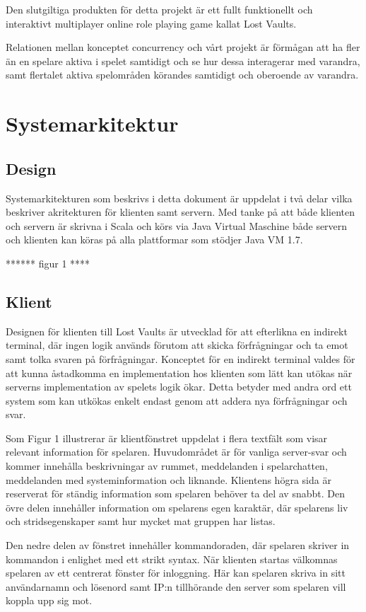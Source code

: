 \documentclass[a4paper]{article}
\begin{document}
Den slutgiltiga produkten för detta projekt är ett fullt funktionellt och interaktivt multiplayer online role playing game kallat Lost Vaults.

Relationen mellan konceptet concurrency och vårt projekt är förmågan att ha fler än en spelare aktiva i spelet samtidigt och se hur dessa interagerar med varandra, samt flertalet 
aktiva spelområden körandes samtidigt och oberoende av varandra.

\section{Systemarkitektur}
\subsection{Design}
Systemarkitekturen som beskrivs i detta dokument är uppdelat i två delar vilka beskriver akritekturen för klienten samt servern. Med tanke på att både klienten och servern är skrivna i Scala och körs via Java Virtual Maschine både servern och klienten kan köras på alla plattformar som stödjer Java VM 1.7.


****** figur 1 ****




\subsection{Klient}
Designen för klienten till Lost Vaults är utvecklad för att efterlikna en indirekt terminal, där ingen logik används förutom att skicka förfrågningar och 
ta emot samt tolka svaren på förfrågningar. Konceptet för en indirekt terminal valdes för att kunna åstadkomma en implementation hos klienten som lätt kan utökas när serverns implementation av spelets logik ökar. Detta betyder med andra ord ett system som kan utkökas enkelt endast genom att addera nya förfrågningar och svar.

Som Figur 1 illustrerar är klientfönstret uppdelat i flera textfält som visar relevant information för spelaren. Huvudområdet är för vanliga server-svar och kommer innehålla beskrivningar 
av rummet, meddelanden i spelarchatten, meddelanden med systeminformation och liknande. Klientens högra sida är reserverat för ständig information som spelaren behöver ta del av snabbt. 
Den övre delen innehåller information om spelarens egen karaktär, där spelarens liv och stridsegenskaper samt hur mycket mat gruppen har listas. 

Den nedre delen av fönstret innehåller kommandoraden, där spelaren skriver in kommandon i enlighet med ett strikt syntax. När klienten startas välkomnas spelaren 
av ett centrerat fönster för inloggning. Här kan spelaren skriva in sitt användarnamn och lösenord samt IP:n tillhörande den server som spelaren vill koppla upp sig mot. 
\end{document}
